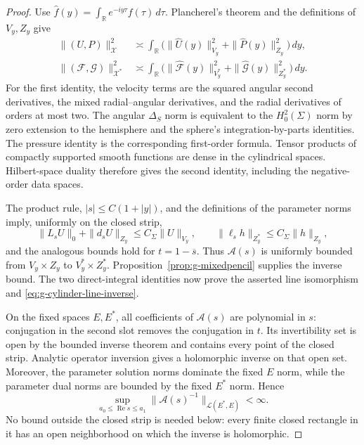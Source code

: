 \documentclass[11pt,a4paper]{article}
\theoremstyle{remark}
\numberwithin{equation}{section}
\begin{document}
\begin{proof}
Use $\widehat f(y)=\int_{\mathbb R}e^{-iy\tau}f(\tau)\,d\tau$.
Plancherel's theorem and the definitions of $V_y,Z_y$ give
\begin{align}
 \|(U,P)\|_{\mathcal X}^2
 &\asymp\int_{\mathbb R}
 \bigl(\|\widehat U(y)\|_{V_y}^2+
       \|\widehat P(y)\|_{Z_y}^2\bigr)\,dy,
 \label{eq:g-cylindrical-plancherel}\\
 \|(\mathcal F,\mathcal G)\|_{\mathcal X^*}^2
 &\asymp\int_{\mathbb R}
 \bigl(\|\widehat{\mathcal F}(y)\|_{V_y^*}^2+
       \|\widehat{\mathcal G}(y)\|_{Z_y^*}^2\bigr)\,dy.
 \label{eq:g-cylindrical-duality}
\end{align}
For the first identity, the velocity terms are the squared angular
second derivatives, the mixed radial--angular derivatives, and the
radial derivatives of orders at most two. The angular $\Delta_S$ norm
is equivalent to the $H^2_0(\Sigma)$ norm by zero extension to the
hemisphere and the sphere's integration-by-parts identities. The
pressure identity is the corresponding first-order formula.
Tensor products of compactly supported smooth functions are dense in
the cylindrical spaces. Hilbert-space duality therefore gives the
second identity, including the negative-order data spaces.

The product rule, $|s|\le C(1+|y|)$, and the definitions of the parameter
norms imply, uniformly on the closed strip,
\[
 \|L_sU\|_0+\|d_sU\|_{Z_y}\le C_\Sigma\|U\|_{V_y},
 \qquad
 \|\ell_sh\|_{Z_y^*}\le C_\Sigma\|h\|_{Z_y},
\]
and the analogous bounds hold for $t=1-\overline s$.
Thus $\mathcal A(s)$ is uniformly bounded from
$V_y\times Z_y$ to $V_y^*\times Z_y^*$.
Proposition~\ref{prop:g-mixedpencil} supplies the inverse bound.
The two direct-integral identities now prove the asserted line
isomorphism and \eqref{eq:g-cylinder-line-inverse}.

On the fixed spaces $E,E^*$, all coefficients of $\mathcal A(s)$ are
polynomial in $s$: conjugation in the second slot removes the
conjugation in $t$. Its invertibility set is open by the bounded
inverse theorem and contains every point of the closed strip.
Analytic operator inversion gives a holomorphic inverse on that open
set. Moreover, the parameter solution norms dominate the fixed
$E$ norm, while the parameter dual norms are bounded by the fixed
$E^*$ norm. Hence
\[
 \sup_{a_0\le\operatorname{Re}s\le a_1}
 \|\mathcal A(s)^{-1}\|_{\mathcal L(E^*,E)}<\infty.
\]
No bound outside the closed strip is needed below: every finite
closed rectangle in it has an open neighborhood on which the inverse
is holomorphic.


\end{proof}
\end{document}

